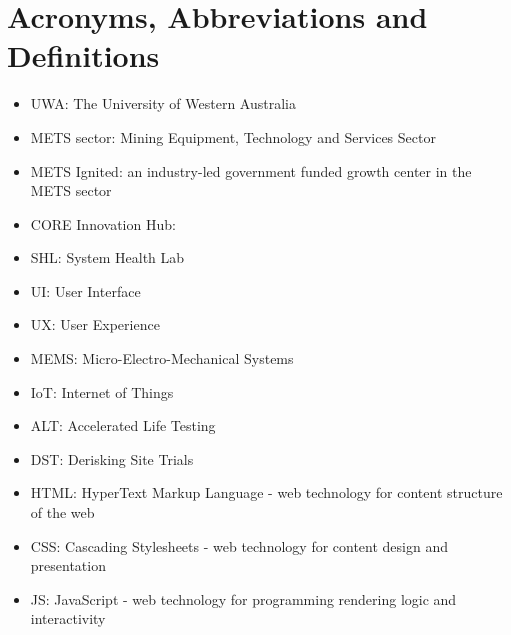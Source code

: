 \section{Acronyms, Abbreviations and Definitions}

    \begin{itemize}
        \item UWA: The University of Western Australia
        \item METS sector:  Mining Equipment, Technology and Services Sector
        \item METS Ignited: an industry-led government funded growth center in the METS sector
        \item CORE Innovation Hub: 
        \item SHL: System Health Lab
        \item UI: User Interface
        \item UX: User Experience
        \item MEMS: Micro-Electro-Mechanical Systems
        \item IoT: Internet of Things
        \item ALT: Accelerated Life Testing
        \item DST: Derisking Site Trials
        \item HTML: HyperText Markup Language - web technology for content structure of the web
        \item CSS: Cascading Stylesheets - web technology for content design and presentation
        \item JS: JavaScript - web technology for programming rendering logic and interactivity
    \end{itemize}
    

